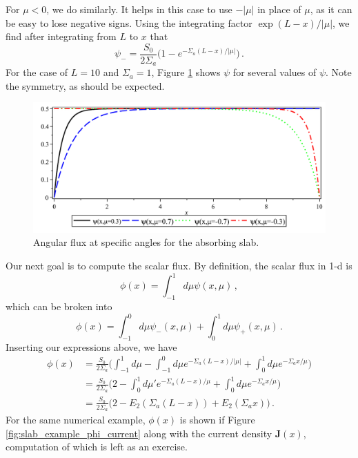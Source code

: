 For $\mu<0$, we do similarly.  It helps in this case to use $-|\mu|$ in place of $\mu$, as it can be easy to lose negative signs.  Using the integrating factor $\exp{(L-x)/|\mu|}$, we find after integrating from $L$ to $x$ that
\begin{equation}
 \psi_{-} = \frac{S_0}{2\Sigma_a}\Bigg (1 - e^{-\Sigma_a (L-x)/|\mu|} \Bigg ) \, .
\end{equation}
For the case of $L = 10$ and $\Sigma_a = 1$, Figure \ref{fig:slab_example_psi} shows $\psi$ for several values of $\psi$.  Note the symmetry, as should be expected. 

\begin{figure}[ht] 
    \centering
    \includegraphics[keepaspectratio, width = 5.0 in]{slab_example_psi}
    \caption{Angular flux at specific angles for the absorbing slab.}
    \label{fig:slab_example_psi}
\end{figure}

Our next goal is to compute the scalar flux.  By definition, the scalar flux in 1-d is
\begin{equation}
 \phi(x) = \int^1_{-1} d\mu \psi(x,\mu) \, ,
\end{equation}
which can be broken into
\begin{equation}
  \phi(x) = \int^0_{-1} d\mu \psi_{-}(x,\mu) + \int^1_{0} d\mu \psi_{+}(x,\mu) \, .
\end{equation}
Inserting our expressions above, we have
\begin{equation}
\begin{split}
  \phi(x) &= \frac{S_0}{2\Sigma_a} \Bigg (  \int^{1}_{-1} d\mu - \int^0_{-1} d\mu  e^{-\Sigma_a (L-x)/|\mu|} + \int^1_{0} d\mu e^{-\Sigma_a x/\mu}  \Bigg ) \\
          &= \frac{S_0}{2\Sigma_a} \Bigg ( 2 - \int^1_{0} d\mu'  e^{-\Sigma_a (L-x)/\mu} + \int^1_{0} d\mu e^{-\Sigma_a x/\mu}  \Bigg ) \\
          &= \frac{S_0}{2\Sigma_a} \Bigg ( 2 - E_2(\Sigma_a (L-x)) + E_2(\Sigma_a x)  \Bigg ) \, .
\end{split}
\end{equation}
For the same numerical example, $\phi(x)$ is shown if Figure \ref{fig:slab_example_phi_current} along with the current density $\mathbf{J}(x)$, computation of which is left as an exercise.

